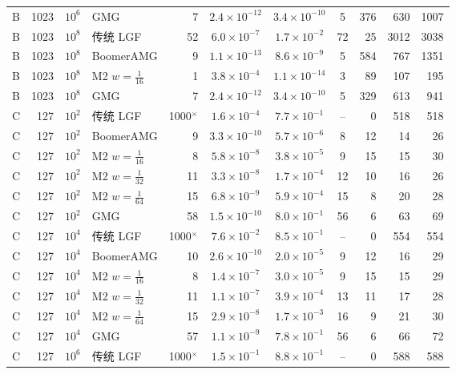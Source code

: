 \begin{longtable}{lrrlrcccrrr}
B & 1023 & $10^{6}$ & GMG & 7 & $2.4{\times}10^{-12}$ & $3.4{\times}10^{-10}$ & 5 & 376 & 630 & 1007 \\
B & 1023 & $10^{8}$ & 传统 LGF & 52 & $6.0{\times}10^{-7}$ & $1.7{\times}10^{-2}$ & 72 & 25 & 3012 & 3038 \\
B & 1023 & $10^{8}$ & BoomerAMG & 9 & $1.1{\times}10^{-13}$ & $8.6{\times}10^{-9}$ & 5 & 584 & 767 & 1351 \\
B & 1023 & $10^{8}$ & M2 $w{=}\frac1{16}$ & 1 & $3.8{\times}10^{-4}$ & $1.1{\times}10^{-14}$ & 3 & 89 & 107 & 195 \\
B & 1023 & $10^{8}$ & GMG & 7 & $2.4{\times}10^{-12}$ & $3.4{\times}10^{-10}$ & 5 & 329 & 613 & 941 \\
C & 127 & $10^{2}$ & 传统 LGF & 1000$^\times$ & $1.6{\times}10^{-4}$ & $7.7{\times}10^{-1}$ & -- & 0 & 518 & 518 \\
C & 127 & $10^{2}$ & BoomerAMG & 9 & $3.3{\times}10^{-10}$ & $5.7{\times}10^{-6}$ & 8 & 12 & 14 & 26 \\
C & 127 & $10^{2}$ & M2 $w{=}\frac1{16}$ & 8 & $5.8{\times}10^{-8}$ & $3.8{\times}10^{-5}$ & 9 & 15 & 15 & 30 \\
C & 127 & $10^{2}$ & M2 $w{=}\frac1{32}$ & 11 & $3.3{\times}10^{-8}$ & $1.7{\times}10^{-4}$ & 12 & 10 & 16 & 26 \\
C & 127 & $10^{2}$ & M2 $w{=}\frac1{64}$ & 15 & $6.8{\times}10^{-9}$ & $5.9{\times}10^{-4}$ & 15 & 8 & 20 & 28 \\
C & 127 & $10^{2}$ & GMG & 58 & $1.5{\times}10^{-10}$ & $8.0{\times}10^{-1}$ & 56 & 6 & 63 & 69 \\
C & 127 & $10^{4}$ & 传统 LGF & 1000$^\times$ & $7.6{\times}10^{-2}$ & $8.5{\times}10^{-1}$ & -- & 0 & 554 & 554 \\
C & 127 & $10^{4}$ & BoomerAMG & 10 & $2.6{\times}10^{-10}$ & $2.0{\times}10^{-5}$ & 9 & 12 & 16 & 29 \\
C & 127 & $10^{4}$ & M2 $w{=}\frac1{16}$ & 8 & $1.4{\times}10^{-7}$ & $3.0{\times}10^{-5}$ & 9 & 15 & 15 & 29 \\
C & 127 & $10^{4}$ & M2 $w{=}\frac1{32}$ & 11 & $1.1{\times}10^{-7}$ & $3.9{\times}10^{-4}$ & 13 & 11 & 17 & 28 \\
C & 127 & $10^{4}$ & M2 $w{=}\frac1{64}$ & 15 & $2.9{\times}10^{-8}$ & $1.7{\times}10^{-3}$ & 16 & 9 & 21 & 30 \\
C & 127 & $10^{4}$ & GMG & 57 & $1.1{\times}10^{-9}$ & $7.8{\times}10^{-1}$ & 56 & 6 & 66 & 72 \\
C & 127 & $10^{6}$ & 传统 LGF & 1000$^\times$ & $1.5{\times}10^{-1}$ & $8.8{\times}10^{-1}$ & -- & 0 & 588 & 588 \\

\end{longtable}

